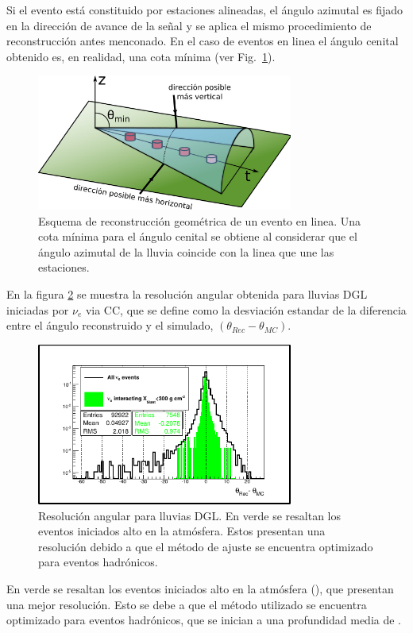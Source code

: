 	Si el evento está constituido por estaciones alineadas, el ángulo azimutal es fijado en la dirección de avance de la señal y se aplica el mismo procedimiento de reconstrucción antes menconado.
	En el caso de eventos en linea el ángulo cenital obtenido es, en realidad, una cota mínima (ver Fig.~\ref{fig:conoLineEvent}).
	\begin{figure}[ht]
	\begin{center}
	\includegraphics[width=0.75\textwidth]{fig/seleccionAuger/conoLineEvent.pdf}
	\caption{Esquema de reconstrucción geométrica de un evento en linea. Una cota mínima para el ángulo cenital se obtiene al considerar que el ángulo azimutal de la lluvia coincide con la linea que une las estaciones.}
	\label{fig:conoLineEvent}
	\end{center}
	\end{figure} 
	
	En la figura \ref{fig:resDGL} se muestra la resolución angular obtenida para lluvias DGL iniciadas por $\nu_e$ via CC, que se define como la desviación estandar de la diferencia entre el ángulo reconstruido y el simulado, $(\theta_{Rec}-\theta_{MC})$.
	\begin{figure}[ht]
	\begin{center}
	\includegraphics[width=0.75\textwidth]{fig/seleccionAuger/resDGL.pdf}
	\caption{Resolución angular para lluvias DGL. En verde se resaltan los eventos iniciados alto en la atmósfera. Estos presentan una resolución debido a que el método de ajuste se encuentra optimizado para eventos hadrónicos.}
	\label{fig:resDGL}
	\end{center}
	\end{figure}
	En verde se resaltan los eventos iniciados alto en la atmósfera (), que presentan una mejor resolución. 
	Esto se debe a que el método utilizado se encuentra optimizado para eventos hadrónicos, que se inician a una profundidad media de .
	
